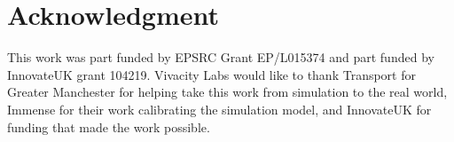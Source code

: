\documentclass[conference]{IEEEtran}
\begin{document}
%





\section*{Acknowledgment}
This work was part funded by EPSRC Grant EP/L015374 and part funded by InnovateUK grant 104219. 
Vivacity Labs would like to thank Transport for Greater Manchester for helping take this work from simulation to the real world, Immense for their work calibrating the simulation model, and InnovateUK for funding that made the work possible.


\end{document}
